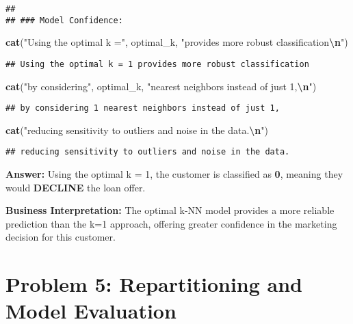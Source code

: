 \documentclass[
]{article}
\newenvironment{Shaded}{\begin{snugshade}}{\end{snugshade}}
\newcommand{\FunctionTok}[1]{\textcolor[rgb]{0.13,0.29,0.53}{\textbf{#1}}}
\newcommand{\NormalTok}[1]{#1}
\newcommand{\SpecialCharTok}[1]{\textcolor[rgb]{0.81,0.36,0.00}{\textbf{#1}}}
\newcommand{\StringTok}[1]{\textcolor[rgb]{0.31,0.60,0.02}{#1}}
\begin{document}
\begin{verbatim}
## 
## ### Model Confidence:
\end{verbatim}

\begin{Shaded}
\begin{Highlighting}[]
\FunctionTok{cat}\NormalTok{(}\StringTok{"Using the optimal k ="}\NormalTok{, optimal\_k, }\StringTok{"provides more robust classification}\SpecialCharTok{\textbackslash{}n}\StringTok{"}\NormalTok{)}
\end{Highlighting}
\end{Shaded}

\begin{verbatim}
## Using the optimal k = 1 provides more robust classification
\end{verbatim}

\begin{Shaded}
\begin{Highlighting}[]
\FunctionTok{cat}\NormalTok{(}\StringTok{"by considering"}\NormalTok{, optimal\_k, }\StringTok{"nearest neighbors instead of just 1,}\SpecialCharTok{\textbackslash{}n}\StringTok{"}\NormalTok{)}
\end{Highlighting}
\end{Shaded}

\begin{verbatim}
## by considering 1 nearest neighbors instead of just 1,
\end{verbatim}

\begin{Shaded}
\begin{Highlighting}[]
\FunctionTok{cat}\NormalTok{(}\StringTok{"reducing sensitivity to outliers and noise in the data.}\SpecialCharTok{\textbackslash{}n}\StringTok{"}\NormalTok{)}
\end{Highlighting}
\end{Shaded}

\begin{verbatim}
## reducing sensitivity to outliers and noise in the data.
\end{verbatim}

\textbf{Answer:} Using the optimal k = 1, the customer is classified as
\textbf{0}, meaning they would \textbf{DECLINE} the loan offer.

\textbf{Business Interpretation:} The optimal k-NN model provides a more
reliable prediction than the k=1 approach, offering greater confidence
in the marketing decision for this customer.

\section{Problem 5: Repartitioning and Model
Evaluation}\label{problem-5-repartitioning-and-model-evaluation}
\end{document}
